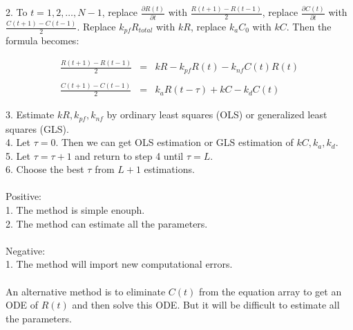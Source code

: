 \documentclass[12pt]{article}
\begin{document}
2. To $t = 1, 2, \ldots , N - 1$, replace $\frac{\partial{}R(t)}{\partial{}t}$ with $\frac{R(t + 1) - R(t - 1)}{2}$, replace $\frac{\partial{}C(t)}{\partial{}t}$ with $\frac{C(t + 1) - C(t - 1)}{2}$. Replace $k_{pf}R_{total}$ with $kR$, replace $k_{a}C_{0}$ with $kC$. Then the formula becomes:

\begin{equation}
  \begin{array}{rcl}
    \frac{R(t + 1) - R(t - 1)}{2} & = & kR - k_{pf}R(t) - k_{nf}C(t)R(t) \\
    & & \\
    \frac{C(t + 1) - C(t - 1)}{2} & = & k_{a}R(t - \tau) + kC - k_{d}C(t)
  \end{array}
\end{equation}

3. Estimate $kR, k_{pf}, k_{nf}$ by ordinary least squares (OLS) or generalized least squares (GLS). \\ 

4. Let $\tau = 0$. Then we can get OLS estimation or GLS estimation of $kC, k_{a}, k_{d}$. \\

5. Let $\tau = \tau + 1$ and return to step 4 until $\tau = L$. \\

6. Choose the best $\tau$ from $L + 1$ estimations. \\ \\

Positive: \\

1. The method is simple enouph. \\

2. The method can estimate all the parameters. \\ \\

Negative: \\

1. The method will import new computational errors. \\ \\

An alternative method is to eliminate $C(t)$ from the equation array to get an ODE of $R(t)$ and then solve this ODE. But it will be difficult to estimate all the parameters. 
\end{document}
